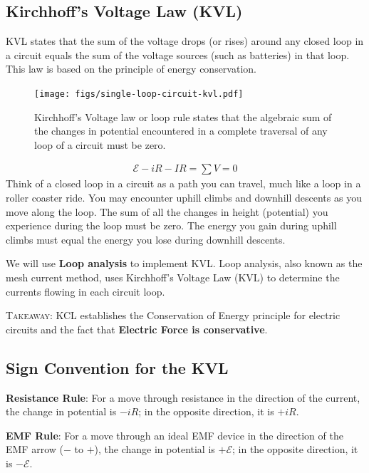 \documentclass[12pt,b4paper]{article}
\begin{document}
\subsection{Kirchhoff's Voltage Law (KVL)}
KVL states that the sum of the voltage drops (or rises) around any closed loop in a circuit equals the sum of the voltage sources (such as batteries) in that loop. This law is based on the principle of energy conservation.
\begin{figure}[H]
    \centering
    \texttt{[image: figs/single-loop-circuit-kvl.pdf]}
    \caption{Kirchhoff’s Voltage law or loop rule states that the algebraic sum of the changes in potential encountered in a complete traversal of any loop of a circuit must be zero.}
    \label{fig:kcl-def}
\end{figure}
\begin{align*}
    \mathcal{E}-iR-IR=\sum V=0
\end{align*}
Think of a closed loop in a circuit as a path you can travel, much like a loop in a roller coaster ride. You may encounter uphill climbs and downhill descents as you move along the loop. The sum of all the changes in height (potential) you experience during the loop must be zero. The energy you gain during uphill climbs must equal the energy you lose during downhill descents.

We will use \textbf{Loop analysis} to implement KVL. Loop analysis, also known as the mesh current method, uses Kirchhoff's Voltage Law (KVL) to determine the currents flowing in each circuit loop.

\textsc{Takeaway}: KCL establishes the Conservation of Energy principle for electric circuits and the fact that \textbf{Electric Force is conservative}.
\subsection*{Sign Convention for the KVL}
\textbf{Resistance Rule}: For a move through resistance in the direction of the current, the change in potential is $-iR$; in the opposite direction, it is $+iR$.

\textbf{EMF Rule}: For a move through an ideal EMF device in the direction of the EMF arrow ($-$ to $+$), the change in potential is $+\mathcal{E}$; in the opposite direction, it is $-\mathcal{E}$.
\end{document}
